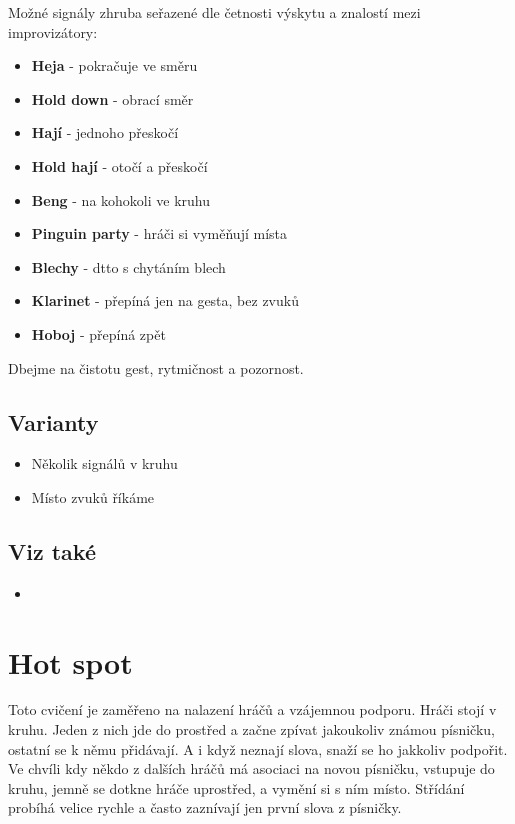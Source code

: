 \documentclass[main.tex]{subfiles}
\begin{document}
Možné signály zhruba seřazené dle četnosti výskytu a znalostí mezi improvizátory: 
\begin{itemize}
\item \textbf{Heja}{} - pokračuje ve směru
\item \textbf{Hold down}{} - obrací směr
\item \textbf{Hají}{} - jednoho přeskočí
\item \textbf{Hold hají}{} - otočí a přeskočí
\item \textbf{Beng}{} - na kohokoli ve kruhu
\item \textbf{Pinguin party}{} - hráči si vyměňují místa
\item \textbf{Blechy}{} -  dtto s chytáním blech
\item \textbf{Klarinet}{} -  přepíná jen na gesta, bez zvuků
\item \textbf{Hoboj}{} - přepíná zpět
\end{itemize}
 
Dbejme na čistotu gest, rytmičnost a pozornost. 
 
\subsection{Varianty} \begin{itemize}
\item Několik signálů v kruhu
\item Místo zvuků říkáme 
\end{itemize}
 
\subsection{Viz také} \begin{itemize}
\item  {}
\end{itemize}
 
 
 
\needspace{5cm} \section{Hot spot} \label{hot spot} Toto cvičení je zaměřeno na nalazení hráčů a vzájemnou podporu. Hráči stojí v kruhu. Jeden z nich jde do prostřed a začne zpívat jakoukoliv známou písničku, ostatní se k němu přidávají. A i když neznají slova, snaží se ho jakkoliv podpořit. Ve chvíli kdy někdo z dalších hráčů má asociaci na novou písničku, vstupuje do kruhu, jemně se dotkne hráče uprostřed, a vymění si s ním místo. Střídání probíhá velice rychle a často zaznívají jen první slova z písničky. 
 
\end{document}

